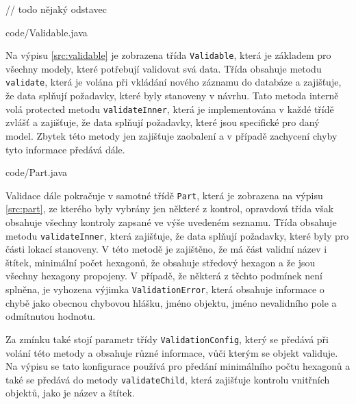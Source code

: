 // todo nějaký odstavec

%
    {code/Validable.java}

Na výpisu \ref{src:validable} je zobrazena třída \texttt{Validable}, která je základem pro všechny modely, které potřebují validovat svá data. Třída obsahuje metodu \texttt{validate}, která je volána při vkládání nového záznamu do databáze a zajišťuje, že data splňují požadavky, které byly stanoveny v návrhu. Tato metoda interně volá protected metodu \texttt{validateInner}, která je implementována v každé třídě zvlášť a zajišťuje, že data splňují požadavky, které jsou specifické pro daný model. Zbytek této metody jen zajišťuje zaobalení a v případě zachycení chyby tyto informace předává dále.

%
    {code/Part.java}

Validace dále pokračuje v samotné třídě \texttt{Part}, která je zobrazena na výpisu \ref{src:part}, ze kterého byly vybrány jen některé z kontrol, opravdová třída však obsahuje všechny kontroly zapsané ve výše uvedeném seznamu. Třída obsahuje metodu \texttt{validateInner}, která zajišťuje, že data splňují požadavky, které byly pro části lokací stanoveny. V této metodě je zajištěno, že má část validní název i štítek, minimální počet hexagonů, že obsahuje středový hexagon a že jsou všechny hexagony propojeny. V případě, že některá z těchto podmínek není splněna, je vyhozena výjimka \texttt{ValidationError}, která obsahuje informace o chybě jako obecnou chybovou hlášku, jméno objektu, jméno nevalidního pole a odmítnutou hodnotu.

Za zmínku také stojí parametr třídy  \texttt{ValidationConfig}, který se předává při volání této metody a obsahuje různé informace, vůči kterým se objekt validuje. Na výpisu se tato konfigurace používá pro předání minimálního počtu hexagonů a také se předává do metody \texttt{validateChild}, která zajišťuje kontrolu vnitřních objektů, jako je název a štítek.


